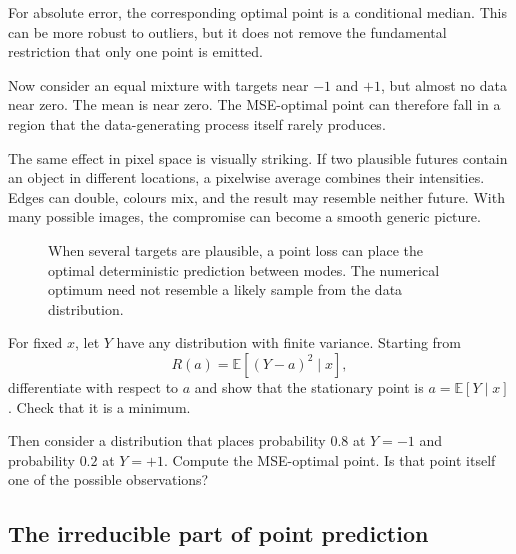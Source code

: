 For absolute error, the corresponding optimal point is a conditional median. This can be more robust to outliers, but it does not remove the fundamental restriction that only one point is emitted.

Now consider an equal mixture with targets near \(-1\) and \(+1\), but almost no data near zero. The mean is near zero. The MSE-optimal point can therefore fall in a region that the data-generating process itself rarely produces.

The same effect in pixel space is visually striking. If two plausible futures contain an object in different locations, a pixelwise average combines their intensities. Edges can double, colours mix, and the result may resemble neither future. With many possible images, the compromise can become a smooth generic picture.

\begin{figure}[ht]
  \caption{When several targets are plausible, a point loss can place the optimal deterministic prediction between modes. The numerical optimum need not resemble a likely sample from the data distribution.}
  \label{fig:week8-point-average}
\end{figure}

\begin{optionalexercise}[title={Optional mathematics --- why the mean appears}]
For fixed \(x\), let \(Y\) have any distribution with finite variance. Starting from
\[
  R(a)=\mathbb{E}[(Y-a)^2\mid x],
\]
differentiate with respect to \(a\) and show that the stationary point is \(a=\mathbb{E}[Y\mid x]\). Check that it is a minimum.

Then consider a distribution that places probability \(0.8\) at \(Y=-1\) and probability \(0.2\) at \(Y=+1\). Compute the MSE-optimal point. Is that point itself one of the possible observations?
\end{optionalexercise}

\subsection{The irreducible part of point prediction}

